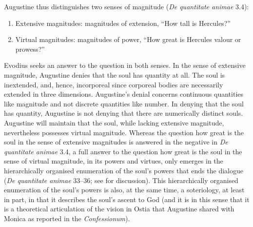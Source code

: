 \documentclass[12pt]{article}
\begin{document}
Augustine thus distinguishes two senses of magnitude (\emph{De quantitate animae} 3.4):
\begin{enumerate}
	\item Extensive magnitudes: magnitudes of extension, “How tall is Hercules?”
	\item Virtual magnitudes: magnitudes of power, “How great is Hercules valour or prowess?”
\end{enumerate}
Evodius seeks an answer to the question in both senses. In the sense of extensive magnitude, Augustine denies that the soul has quantity at all. The soul is inextended, and, hence, incorporeal since corporeal bodies are necessarily extended in three dimensions. Augustine's denial concerns continuous quantities like magnitude and not discrete quantities like number. In denying that the soul has quantity, Augustine is not denying that there are numerically distinct souls. Augustine will maintain that the soul, while lacking extensive magnitude, nevertheless possesses virtual magnitude. Whereas the question how great is the soul in the sense of extensive magnitudes is answered in the negative in \emph{De quantitate animae} 3.4, a full answer to the question how great is the soul in the sense of virtual magnitude, in its powers and virtues, only emerges in the hierarchically organised enumeration of the soul’s powers that ends the dialogue (\emph{De quantitate animae} 33–36; see \citealt{Brittain2003-BRICA-2} for discussion). This hierarchically organised enumeration of the soul’s powers is also, at the same time, a soteriology, at least in part, in that it describes the soul’s ascent to God (and it is in this sense that it is a theoretical articulation of the vision in Ostia that Augustine shared with Monica as reported in the \emph{Confessionum}).
\end{document}
